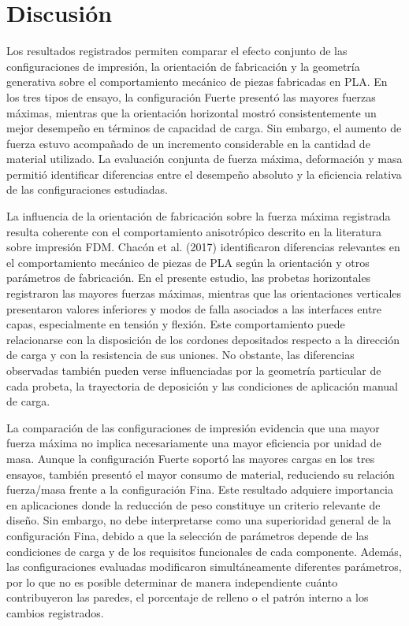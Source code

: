 \documentclass[10pt,twocolumn]{article}
\begin{document}
\section{Discusión}
Los resultados registrados permiten comparar el efecto conjunto de las configuraciones de impresión, la orientación de fabricación y la geometría generativa sobre el comportamiento mecánico de piezas fabricadas en PLA. En los tres tipos de ensayo, la configuración Fuerte presentó las mayores fuerzas máximas, mientras que la orientación horizontal mostró consistentemente un mejor desempeño en términos de capacidad de carga. Sin embargo, el aumento de fuerza estuvo acompañado de un incremento considerable en la cantidad de material utilizado. La evaluación conjunta de fuerza máxima, deformación y masa permitió identificar diferencias entre el desempeño absoluto y la eficiencia relativa de las configuraciones estudiadas.

La influencia de la orientación de fabricación sobre la fuerza máxima registrada resulta coherente con el comportamiento anisotrópico descrito en la literatura sobre impresión FDM. Chacón et al. (2017) identificaron diferencias relevantes en el comportamiento mecánico de piezas de PLA según la orientación y otros parámetros de fabricación. En el presente estudio, las probetas horizontales registraron las mayores fuerzas máximas, mientras que las orientaciones verticales presentaron valores inferiores y modos de falla asociados a las interfaces entre capas, especialmente en tensión y flexión. Este comportamiento puede relacionarse con la disposición de los cordones depositados respecto a la dirección de carga y con la resistencia de sus uniones. No obstante, las diferencias observadas también pueden verse influenciadas por la geometría particular de cada probeta, la trayectoria de deposición y las condiciones de aplicación manual de carga.

La comparación de las configuraciones de impresión evidencia que una mayor fuerza máxima no implica necesariamente una mayor eficiencia por unidad de masa. Aunque la configuración Fuerte soportó las mayores cargas en los tres ensayos, también presentó el mayor consumo de material, reduciendo su relación fuerza/masa frente a la configuración Fina. Este resultado adquiere importancia en aplicaciones donde la reducción de peso constituye un criterio relevante de diseño. Sin embargo, no debe interpretarse como una superioridad general de la configuración Fina, debido a que la selección de parámetros depende de las condiciones de carga y de los requisitos funcionales de cada componente. Además, las configuraciones evaluadas modificaron simultáneamente diferentes parámetros, por lo que no es posible determinar de manera independiente cuánto contribuyeron las paredes, el porcentaje de relleno o el patrón interno a los cambios registrados.
\end{document}
